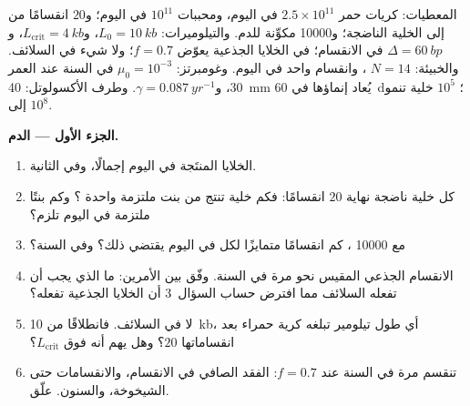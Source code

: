 \begin{problem}
\label{pb:b3:stem-cells:1}
المعطيات: كريات حمر $2.5\times 10^{11}$ في اليوم، ومحببات
$10^{11}$ في اليوم؛ و$20$ انقسامًا من  إلى
الخلية الناضجة؛ و\num{10000}  مكوِّنة للدم.
والتيلوميرات: $L_{0} = \qty{10}{kb}$،
و$L_{\text{crit}} = \qty{4}{kb}$، و$\Delta = \qty{60}{bp}$ في الانقسام؛
 في الخلايا الجذعية يعوّض $f = 0.7$؛ ولا شيء في
السلائف. والخبيئة: $N = 14$ ، وانقسام واحد في
اليوم. وغومبرتز: $\mu_{0} =
10^{-3}$ في السنة عند العمر 30، و$\gamma = \qty{0.087}{yr^{-1}}$.
وطرف الأكسولوتل: \qty{40}{mm} يُعاد إنماؤها في \qty{60}{d}؛
 $10^{5}$ خلية تنمو إلى $10^{8}$.

\medskip
\noindent\textbf{الجزء الأول --- الدم.}
\begin{enumerate}
  \item الخلايا المنتَجة في اليوم إجمالًا، وفي الثانية.
  \item كل خلية ناضجة نهاية $20$ انقسامًا: فكم خلية تنتج من
        بنت ملتزمة واحدة ؟ وكم بنتًا ملتزمة في
        اليوم تلزم؟
  \item مع \num{10000} ، كم انقسامًا متمايزًا لكل
         في اليوم يقتضي ذلك؟ وفي السنة؟
  \item الانقسام الجذعي المقيس نحو مرة في السنة. وفّق بين
        الأمرين: ما الذي يجب أن تفعله السلائف مما افترض حساب
        السؤال~3 أن الخلايا الجذعية تفعله؟
  \item لا  في السلائف. فانطلاقًا من \qty{10}{kb}، أي
        طول تيلومير تبلغه  كرية حمراء بعد انقساماتها
        $20$؟ وهل يهم أنه فوق $L_{\text{crit}}$؟
  \item {} تنقسم مرة في السنة عند $f = 0.7$: الفقد
        الصافي في الانقسام، والانقسامات حتى الشيخوخة، والسنون.
        علّق.
\end{enumerate}


\end{problem}
